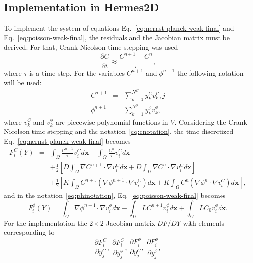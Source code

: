 \subsection{Implementation in Hermes2D}
To implement the system of equations Eq.~\eqref{eq:nernst-planck-weak-final}
and Eq.~\eqref{eq:poisson-weak-final}, the residuals and the Jacobian
matrix must be derived. For that, Crank-Nicolson time stepping was
used
\begin{equation}
  \frac{\partial C}{\partial t} \approx \frac{C^{n+1} - C^n}{\tau},
  \label{eq:cranic}
\end{equation}
where $\tau$ is a time step. For the variables $C^{n+1}$ and $\phi^{n+1}$ the
following notation will be used:
\begin{eqnarray}
  C^{n+1} &=& \sum_{k=1}^{N^C} y_k^{C} v_k^{C}, \label{eq:cnotation}j\\
  \phi^{n+1} &=& \sum_{k=1}^{N^{\phi}} y_k^{\phi} v_k^{\phi}\label{eq:phinotation},
\end{eqnarray}
where $v_k^C$ and $v_k^\phi$ are piecewise polynomial functions in $V$.
Considering the Crank-Nicolson time stepping and the notation~\eqref{eq:cnotation},
the time discretized Eq.~\eqref{eq:nernst-planck-weak-final} becomes
\begin{eqnarray}
  F_i^C\left(Y\right) & = & \int_{\Omega} \frac{C^{n+1}}{\tau}v_i^C d\mathbf{x} - 
  \int_{\Omega} \frac{C^{n}}{\tau}v_i^C d\mathbf{x}\nonumber\\
  &&+\frac 12 \left[D\int_{\Omega} \nabla C^{n+1} \cdot \nabla v_i^C d\mathbf{x}+ 
  	D\int_{\Omega} \nabla C^{n} \cdot \nabla v_i^C d\mathbf{x}\right]\nonumber\\
  &&+ \frac 12 \left[K\int_{\Omega}C^{n+1} \left(\nabla \phi^{n+1} \cdot \nabla v_i^C\right) d\mathbf{x}+
  K\int_{\Omega}C^{n} \left(\nabla \phi^{n} \cdot \nabla v_i^C\right) d\mathbf{x}\right]\label{eq:Fc},
\end{eqnarray}
and in the notation~\eqref{eq:phinotation}, Eq.~\eqref{eq:poisson-weak-final} becomes
\begin{equation}
  F_i^{\phi}\left(Y\right) = \int_{\Omega} \nabla \phi^{n+1} \cdot \nabla v_i^{\phi} d\mathbf{x} 
  - \int_{\Omega} LC^{n+1}v_i^{\phi} d\mathbf{x} + \int_{\Omega} LC_0 v_i^{\phi} d\mathbf{x}.
  \label{eq:Fphi}
\end{equation}
For the implementation the $2\times 2$ Jacobian matrix $DF/DY$ with elements corresponding to
\begin{equation}
  \frac{\partial F_i^C}{\partial y_j^C}, \ \frac{\partial F_i^C}{\partial y_j^{\phi}},\  
  \frac{\partial F_i^{\phi}}{\partial y_j^C}, \ \frac{\partial F_i^{\phi}}{\partial y_j^{\phi}},
\end{equation}
